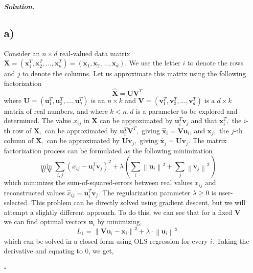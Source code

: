 \documentclass[10pt]{article}
\newenvironment{solution}[1][\it{Solution}]{\textbf{#1. } }{$\square$}
\begin{document}
\begin{solution}
\subsection*{a)}

Consider an $n \times d$ real-valued data matrix $\mathbf{X}=\left(\mathbf{x}_{1}^{T}, \mathbf{x}_{2}^{T}, \ldots, \mathbf{x}_{n}^{T}\right) = \left(\mathbf{x}_{1}, \mathbf{x}_{2}, \ldots, \mathbf{x}_{d}\right)$. We use the letter $i$ to denote the rows and $j$ to denote the columns. Let us approximate this matrix using the following factorization
$$
\hat{\mathbf{X}}=\mathbf{U} \mathbf{V}^{T}
$$
where $\mathbf{U}=\left(\mathbf{u}_{1}^{T}, \mathbf{u}_{2}^{T}, \ldots, \mathbf{u}_{n}^{T}\right)$ is an $n \times k$ and $\mathbf{V}=\left(\mathbf{v}_{1}^{T}, \mathbf{v}_{2}^{T}, \ldots, \mathbf{v}_{d}^{T}\right)$ is a $d \times k$ matrix of real numbers,
and where $k<n, d$ is a parameter to be explored and determined. The value $x_{ij}$ in $\mathbf{X}$ can be approximated by $\mathbf{u}_{i}^{T} \mathbf{v}_{j}$ and that $\mathbf{x}_{i}^{T},$ the $i$-th row of $\mathbf{X},$ can be approximated by $\mathbf{u}_{i}^{T} \mathbf{V}^{T},$ giving $\hat{\mathbf{x}}_{i}=\mathbf{V} \mathbf{u}_{i}$,  and $\mathbf{x}_{j},$ the $j$-th column of $\mathbf{X},$ can be approximated by $ \mathbf{U}\mathbf{v}_{j},$ giving $\hat{\mathbf{x}}_{j}=\mathbf{U} \mathbf{v}_{j}$. The matrix factorization process can be formulated as the following minimization
$$
\min _{\mathbf{U}, \mathbf{V}} \sum_{i, j}\left(x_{i j}-\mathbf{u}_{i}^{T} \mathbf{v}_{j}\right)^{2}+\lambda\left(\sum_{i}\left\|\mathbf{u}_{i}\right\|^{2}+\sum_{j}\left\|\mathbf{v}_{j}\right\|^{2}\right)
$$
which minimizes the sum-of-squared-errors between real values $x_{i j}$ and reconstructed values $\hat{x}_{i j}=\mathbf{u}_{i}^{T} \mathbf{v}_{j}$. The regularization parameter $\lambda \geq 0$ is user-selected. This problem can be directly solved using gradient descent, but we will attempt a slightly different approach. To do this, we can see that for a fixed $\mathbf{V}$ we can find optimal vectors $\mathbf{u}_{i}$ by minimizing,
$$
L_{1} = \left\|\mathbf{V} \mathbf{u}_{i}-\mathbf{x}_{i}\right\|^{2}+\lambda \cdot\left\|\mathbf{u}_{i}\right\|^{2}
$$
which can be solved in a closed form using OLS regression for every $i$. Taking the derivative and equating to $0$, we get,



\end{solution}
\end{document}
